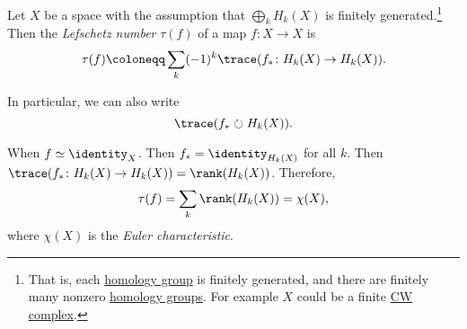 \begin{definition}\label{def:Lefschetz-number}
	Let \(X\) be a space with the assumption that \(\bigoplus_k H_k(X)\) is finitely generated.\footnote{That is, each \hyperref[def:homology-group]{homology group}
		is finitely	generated, and there are finitely many nonzero \hyperref[def:homology-group]{homology groups}.
		For example \(X\) could be a finite \hyperref[def:CW-Complex]{CW complex}.}
	Then the \emph{Lefschetz number} \(\tau(f)\) of a map \(f \colon X \to X\) is
	\[
		\tau(f) \coloneqq \sum_k (-1)^k \trace(f_\ast \colon H_k(X) \to H_k(X)).
	\]
\end{definition}
\begin{remark}
	In particular, we can also write
	\[
		\trace(f_{\ast} \circlearrowright H_{k} (X)).
	\]
\end{remark}

\begin{eg}
	When \(f \simeq \identity _X\). Then \(f_\ast = \identity_{H_k(X)}\) for all \(k\). Then \(\trace(f_\ast \colon H_k(X) \to H_k(X)) = \rank(H_k(X))\).
	Therefore,
	\[
		\tau(f) = \sum_k \rank(H_k(X)) = \chi(X),
	\]
	where \(\chi(X)\) is the \emph{Euler characteristic}.
\end{eg}

